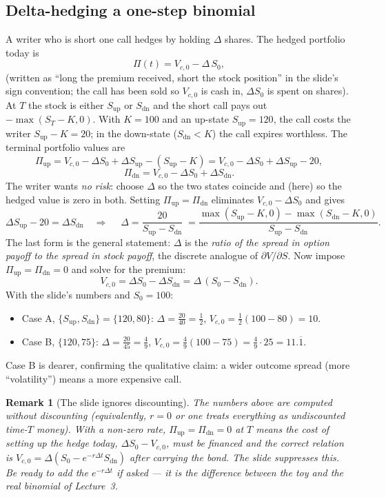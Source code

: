 \documentclass[11pt]{article}
\newtheorem{remark}{Remark}
\begin{document}
\subsection{Delta-hedging a one-step binomial}

A writer who is short one call hedges by holding $\Delta$ shares. The hedged portfolio today is
\[
\Pi(t)=V_{c,0}-\Delta\, S_0,
\]
(written as ``long the premium received, short the stock position'' in the slide's sign convention; the call has been sold so $V_{c,0}$ is cash in, $\Delta S_0$ is spent on shares). At $T$ the stock is either $S_{\mathrm{up}}$ or $S_{\mathrm{dn}}$ and the short call pays out $-\max(S_T-K,0)$. With $K=100$ and an up-state $S_{\mathrm{up}}=120$, the call costs the writer $S_{\mathrm{up}}-K=20$; in the down-state ($S_{\mathrm{dn}}<K$) the call expires worthless. The terminal portfolio values are
\[
\Pi_{\mathrm{up}}=V_{c,0}-\Delta S_0+\Delta S_{\mathrm{up}}-(S_{\mathrm{up}}-K)
=V_{c,0}-\Delta S_0+\Delta S_{\mathrm{up}}-20,
\]
\[
\Pi_{\mathrm{dn}}=V_{c,0}-\Delta S_0+\Delta S_{\mathrm{dn}}.
\]
The writer wants \emph{no risk}: choose $\Delta$ so the two states coincide and (here) so the hedged value is zero in both. Setting $\Pi_{\mathrm{up}}=\Pi_{\mathrm{dn}}$ eliminates $V_{c,0}-\Delta S_0$ and gives
\[
\Delta S_{\mathrm{up}}-20=\Delta S_{\mathrm{dn}}
\quad\Longrightarrow\quad
\boxed{\;\Delta=\dfrac{20}{S_{\mathrm{up}}-S_{\mathrm{dn}}}\;}
=\frac{\max(S_{\mathrm{up}}-K,0)-\max(S_{\mathrm{dn}}-K,0)}{S_{\mathrm{up}}-S_{\mathrm{dn}}}.
\]
The last form is the general statement: $\Delta$ is the \emph{ratio of the spread in option payoff to the spread in stock payoff}, the discrete analogue of $\partial V/\partial S$. Now impose $\Pi_{\mathrm{up}}=\Pi_{\mathrm{dn}}=0$ and solve for the premium:
\[
V_{c,0}=\Delta S_0-\Delta S_{\mathrm{dn}}=\Delta\,(S_0-S_{\mathrm{dn}}).
\]
With the slide's numbers and $S_0=100$:
\begin{itemize}[nosep]
\item Case A, $\{S_{\mathrm{up}},S_{\mathrm{dn}}\}=\{120,80\}$: $\Delta=\tfrac{20}{40}=\tfrac12$, $V_{c,0}=\tfrac12(100-80)=10$.
\item Case B, $\{120,75\}$: $\Delta=\tfrac{20}{45}=\tfrac49$, $V_{c,0}=\tfrac49(100-75)=\tfrac49\cdot 25=11.\overline{1}$.
\end{itemize}
Case B is dearer, confirming the qualitative claim: a wider outcome spread (more ``volatility'') means a more expensive call.

\begin{remark}[The slide ignores discounting]
The numbers above are computed without discounting (equivalently, $r=0$ or one treats everything as undiscounted time-$T$ money). With a non-zero rate, $\Pi_{\mathrm{up}}=\Pi_{\mathrm{dn}}=0$ at $T$ means the cost of setting up the hedge today, $\Delta S_0-V_{c,0}$, must be financed and the correct relation is $V_{c,0}=\Delta(S_0-e^{-r\Delta t}S_{\mathrm{dn}})$ after carrying the bond. The slide suppresses this. Be ready to add the $e^{-r\Delta t}$ if asked --- it is the difference between the toy and the real binomial of Lecture~3.
\end{remark}
\end{document}
